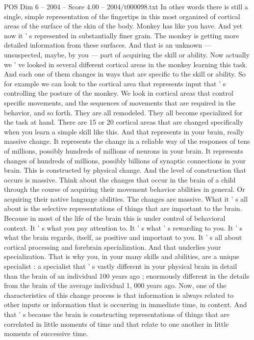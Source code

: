 \begin{textsample}{POS Dim 6 – 2004 – Score 4.00 – 2004/t000098.txt}
In other words there is still a single, simple representation of the fingertips in this most organized of cortical areas of the surface of the skin of the body.
Monkey has like you have.
And yet now it ' s represented in substantially finer grain.
The monkey is getting more detailed information from these surfaces.
And that is an unknown — unsuspected, maybe, by you — part of acquiring the skill or ability.
Now actually we ' ve looked in several different cortical areas in the monkey learning this task.
And each one of them changes in ways that are specific to the skill or ability.
So for example we can look to the cortical area that represents input that ' s controlling the posture of the monkey.
We look in cortical areas that control specific movements, and the sequences of movements that are required in the behavior, and so forth.
They are all remodeled.
They all become specialized for the task at hand.
There are 15 or 20 cortical areas that are changed specifically when you learn a simple skill like this.
And that represents in your brain, really massive change.
It represents the change in a reliable way of the responses of tens of millions, possibly hundreds of millions of neurons in your brain.
It represents changes of hundreds of millions, possibly billions of synaptic connections in your brain.
This is constructed by physical change.
And the level of construction that occurs is massive.
Think about the changes that occur in the brain of a child through the course of acquiring their movement behavior abilities in general.
Or acquiring their native language abilities.
The changes are massive.
What it ' s all about is the selective representations of things that are important to the brain.
Because in most of the life of the brain this is under control of behavioral context.
It ' s what you pay attention to.
It ' s what ' s rewarding to you.
It ' s what the brain regards, itself, as positive and important to you.
It ' s all about cortical processing and forebrain specialization.
And that underlies your specialization.
That is why you, in your many skills and abilities, are a unique specialist : a specialist that ' s vastly different in your physical brain in detail than the brain of an individual 100 years ago ; enormously different in the details from the brain of the average individual 1, 000 years ago.
Now, one of the characteristics of this change process is that information is always related to other inputs or information that is occurring in immediate time, in context.
And that ' s because the brain is constructing representations of things that are correlated in little moments of time and that relate to one another in little moments of successive time.

\end{textsample}
